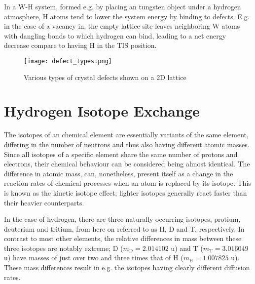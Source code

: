 In a W-H system, formed e.g. by placing an tungsten object under a hydrogen atmosphere, H atoms tend to lower the system energy by binding to defects. 
E.g. in the case of a vacancy in, the empty lattice site leaves neighboring W atoms with dangling bonds to which hydrogen can bind, leading to a net energy decrease compare to having H in the TIS position.

\begin{figure}[!ht]
\center
\texttt{[image: defect\_types.png]}
\caption{Various types of crystal defects shown on a 2D lattice}
\label{Fig:defect_types}
\end{figure}


\section{Hydrogen Isotope Exchange}

The isotopes of an chemical element are essentially variants of the same element, differing in the number of neutrons and thus also having different atomic masses. 
Since all isotopes of a specific element share the same number of protons and electrons, their chemical behaviour can be considered being almost identical. 
The difference in atomic mass,  can, nonetheless, present itself as a change in the reaction rates of chemical processes when an atom is replaced by its isotope. 
This is known as the kinetic isotope effect; lighter isotopes generally react faster than their heavier counterparts. \cite{atkins2006atkins}

In the case of hydrogen, there are three naturally occurring isotopes, protium, deuterium and tritium, from here on referred to as H, D and T, respectively. 
In contrast to most other elements, the relative differences in mass between these three isotopes are notably extreme; D ($m_{\text{D}}=2.014102$ u) and T ($m_{\text{T}}=3.016049$ u) have masses of just over two and three times that of H ($m_{\text{H}}=1.007825$ u). 
These mass differences result in e.g. the isotopes having clearly different diffusion rates.


